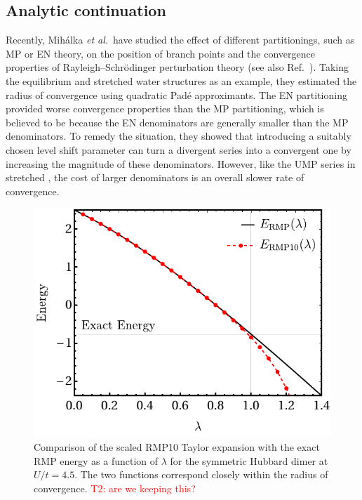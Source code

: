 \documentclass[aps,prb,reprint,noshowkeys,superscriptaddress]{revtex4-1}
\newcommand{\titou}[1]{\textcolor{red}{#1}}
\newcommand{\etal}{\textit{et al.}}
\begin{document}
\subsection{Analytic continuation}

Recently, Mih\'alka \etal\ have studied the effect of different partitionings, such as MP or EN theory, on the position of 
branch points and the convergence properties of Rayleigh--Schr\"odinger perturbation theory\cite{Mihalka_2017b} (see also
Ref.~).
Taking the equilibrium and stretched water structures as an example, they estimated the radius of convergence using quadratic
Pad\'e approximants.
The EN partitioning provided worse convergence properties than the MP partitioning, which is believed to be
because the EN denominators are generally smaller than the MP denominators.
To remedy the situation, they showed that introducing a suitably chosen level shift parameter can turn a 
divergent series into a convergent one by increasing the magnitude of these denominators.\cite{Mihalka_2017b}
However, like the UMP series in stretched ,\cite{Lepetit_1988} 
the cost of larger denominators is an overall slower rate of convergence.

\begin{figure}
    \includegraphics[width=\linewidth]{fig12}
    \caption{%
        Comparison of the scaled RMP10 Taylor expansion with the exact RMP energy as a function
        of $\lambda$ for the symmetric Hubbard dimer at $U/t = 4.5$. 
        The two functions correspond closely within the radius of convergence.
        \titou{T2: are we keeping this?}
    }
    \label{fig:rmp_anal_cont}
\end{figure}
\end{document}
